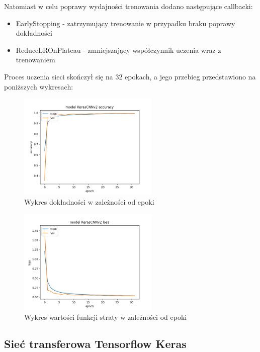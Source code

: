 \documentclass{article}
\begin{document}
Natomiast w celu poprawy wydajności trenowania dodano następujące callbacki:

\begin{itemize}
    \item EarlyStopping - zatrzymujący trenowanie w przypadku braku poprawy dokładności
    \item ReduceLROnPlateau - zmniejszający współczynnik uczenia wraz z trenowaniem
\end{itemize}

Proces uczenia sieci skończył się na 32 epokach, a jego przebieg przedstawiono na poniższych wykresach:

\begin{figure}[H]
    \centering
    \includegraphics[width=0.6\textwidth]{../Saves/KerasCNNv2/mnist-784/KerasCNNv2_mnist_784_ep32_acc.png}
    \caption{Wykres dokładności w zależności od epoki}
\end{figure}

\begin{figure}[H]
    \centering
    \includegraphics[width=0.6\textwidth]{../Saves/KerasCNNv2/mnist-784/KerasCNNv2_mnist_784_ep32_loss.png}
    \caption{Wykres wartości funkcji straty w zależności od epoki}
\end{figure}

\subsection{Sieć transferowa Tensorflow Keras}
\end{document}
